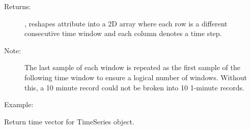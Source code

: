 \documentclass[letterpaper,10pt,english,openany,oneside]{sphinxmanual}
\begin{document}
\begin{fulllineitems}
\begin{fulllineitems}
\begin{description}
\begin{description}
\end{description}

\item[{Returns:}] \leavevmode
{}, reshapes attribute  into a 2D array 
where each row is a different consecutive time window and 
each column denotes a time step.

\item[{Note:}] \leavevmode
The last sample of each window is repeated as the first
sample of the following time window to ensure a logical
number of windows. Without this, a 10 minute record could
not be broken into 10 1-minute records.

\item[{Example:}] \leavevmode
\begin{sphinxVerbatim}[commandchars=\\\{\}]
   
   
  \PYG{p}{[}\PYG{p}{]}
    
\PYG{g+go}{array([[0, 1, 2],}
\PYG{g+go}{    [6, 7, 8]])}
\end{sphinxVerbatim}

\end{description}

\end{fulllineitems}


\begin{fulllineitems}
\label{\detokenize{index:sigpropy.TimeSeries.time}}
Return time vector for TimeSeries object.


\end{fulllineitems}
\end{fulllineitems}
\end{document}
